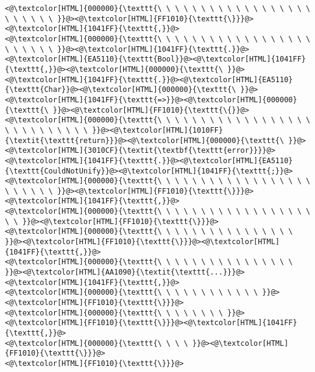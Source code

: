 \begin{lstlisting}
<@\textcolor[HTML]{000000}{\texttt{\ \ \ \ \ \ \ \ \ \ \ \ \ \ \ \ \ \ \ \ \ \ \ \ }}@><@\textcolor[HTML]{FF1010}{\texttt{\}}}@><@\textcolor[HTML]{1041FF}{\texttt{,}}@>
<@\textcolor[HTML]{000000}{\texttt{\ \ \ \ \ \ \ \ \ \ \ \ \ \ \ \ \ \ \ \ \ \ \ \ }}@><@\textcolor[HTML]{1041FF}{\texttt{.}}@><@\textcolor[HTML]{EA5110}{\texttt{Bool}}@><@\textcolor[HTML]{1041FF}{\texttt{,}}@><@\textcolor[HTML]{000000}{\texttt{\ }}@><@\textcolor[HTML]{1041FF}{\texttt{.}}@><@\textcolor[HTML]{EA5110}{\texttt{Char}}@><@\textcolor[HTML]{000000}{\texttt{\ }}@><@\textcolor[HTML]{1041FF}{\texttt{=>}}@><@\textcolor[HTML]{000000}{\texttt{\ }}@><@\textcolor[HTML]{FF1010}{\texttt{\{}}@>
<@\textcolor[HTML]{000000}{\texttt{\ \ \ \ \ \ \ \ \ \ \ \ \ \ \ \ \ \ \ \ \ \ \ \ \ \ \ \ }}@><@\textcolor[HTML]{1010FF}{\textit{\texttt{return}}}@><@\textcolor[HTML]{000000}{\texttt{\ }}@><@\textcolor[HTML]{3010CF}{\textit{\textbf{\texttt{error}}}}@><@\textcolor[HTML]{1041FF}{\texttt{.}}@><@\textcolor[HTML]{EA5110}{\texttt{CouldNotUnify}}@><@\textcolor[HTML]{1041FF}{\texttt{;}}@>
<@\textcolor[HTML]{000000}{\texttt{\ \ \ \ \ \ \ \ \ \ \ \ \ \ \ \ \ \ \ \ \ \ \ \ }}@><@\textcolor[HTML]{FF1010}{\texttt{\}}}@><@\textcolor[HTML]{1041FF}{\texttt{,}}@>
<@\textcolor[HTML]{000000}{\texttt{\ \ \ \ \ \ \ \ \ \ \ \ \ \ \ \ \ \ \ \ }}@><@\textcolor[HTML]{FF1010}{\texttt{\}}}@>
<@\textcolor[HTML]{000000}{\texttt{\ \ \ \ \ \ \ \ \ \ \ \ \ \ \ \ }}@><@\textcolor[HTML]{FF1010}{\texttt{\}}}@><@\textcolor[HTML]{1041FF}{\texttt{,}}@>
<@\textcolor[HTML]{000000}{\texttt{\ \ \ \ \ \ \ \ \ \ \ \ \ \ \ \ }}@><@\textcolor[HTML]{AA1090}{\textit{\texttt{...}}}@><@\textcolor[HTML]{1041FF}{\texttt{,}}@>
<@\textcolor[HTML]{000000}{\texttt{\ \ \ \ \ \ \ \ \ \ \ \ }}@><@\textcolor[HTML]{FF1010}{\texttt{\}}}@>
<@\textcolor[HTML]{000000}{\texttt{\ \ \ \ \ \ \ \ }}@><@\textcolor[HTML]{FF1010}{\texttt{\}}}@><@\textcolor[HTML]{1041FF}{\texttt{,}}@>
<@\textcolor[HTML]{000000}{\texttt{\ \ \ \ }}@><@\textcolor[HTML]{FF1010}{\texttt{\}}}@>
<@\textcolor[HTML]{FF1010}{\texttt{\}}}@>

\end{lstlisting}